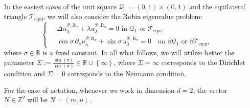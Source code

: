 \documentclass{amsart}
\theoremstyle{definition}
\theoremstyle{remark}
\newcommand{\si}{\sigma}
\newcommand{\pd}{\partial}
\numberwithin{equation}{section}
\theoremstyle{definition}
\theoremstyle{remark}
\begin{document}
In the easiest cases of the unit square $\mathcal{Q}_1=(0,1)\times (0,1)$ and the equilateral triangle $\mathcal{T}_{\mathrm{equi}}$, we will also consider the Robin eigenvalue problem: \begin{equation}\left\{\ \begin{aligned}
		&\Delta u_\lambda^{\mathcal{P},\mathrm{R}_\sigma}+\lambda u_\lambda^{\mathcal{P},\mathrm{R}_\sigma}=0 \text{ in }\mathcal{Q}_1\text{ or }\mathcal{T}_{\mathrm{equi}}\\
		&	\cos\si \, \pd_\nu u_\lambda^{\mathcal{P},\mathrm{R}_\sigma} +\sin \si \, u_\lambda^{\mathcal{P},\mathrm{R}_\sigma} =0 \quad \text{on }\partial \mathcal{Q}_1\text{ or }\partial\mathcal{T}_{\mathrm{equi}},
	\end{aligned}\right.\end{equation}
where $\sigma\in\mathbb{R}$ is a fixed constant. In all what follows, we will utilize better the parameter $\Sigma:=\frac{\sin(\sigma)}{\cos(\sigma)}\in\mathbb{R}\cup\left\{\infty\right\}$, where $\Sigma=\infty$ corresponds to the Dirichlet condition and $\Sigma=0$ corresponds to the Neumann condition.

For the ease of notation, whenever we work in dimension $d=2$, the vector $N\in\mathbb{Z}^2$ will be $N=(m,n)$.
\end{document}
